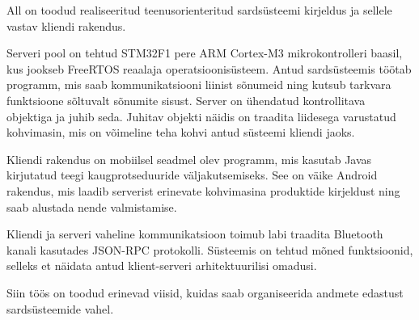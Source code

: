 All on toodud realiseeritud teenusorienteritud sardsüsteemi kirjeldus ja sellele vastav kliendi rakendus.

Serveri pool on tehtud STM32F1 pere ARM Cortex-M3 mikrokontrolleri baasil, kus jookseb FreeRTOS reaalaja operatsioonisüsteem.
Antud sardsüsteemis töötab programm, mis saab kommunikatsiooni liinist sõnumeid ning kutsub tarkvara funktsioone sõltuvalt sõnumite sisust.
Server on ühendatud kontrollitava objektiga ja juhib seda. 
Juhitav objekti näidis on traadita liidesega varustatud kohvimasin, mis on võimeline teha kohvi antud süsteemi kliendi jaoks. 

Kliendi rakendus on mobiilsel seadmel olev programm, mis kasutab Javas kirjutatud teegi kaugprotseduuride väljakutsemiseks.
See on väike Android rakendus, mis laadib serverist erinevate kohvimasina produktide kirjeldust ning saab alustada nende valmistamise.

Kliendi ja serveri vaheline kommunikatsioon toimub labi traadita Bluetooth kanali kasutades JSON-RPC protokolli.
Süsteemis on tehtud mõned funktsioonid, selleks et näidata antud klient-serveri arhitektuurilisi omadusi.

Siin töös on toodud erinevad viisid, kuidas saab organiseerida andmete edastust sardsüsteemide vahel.

\vspace{\fill}
\clearpage